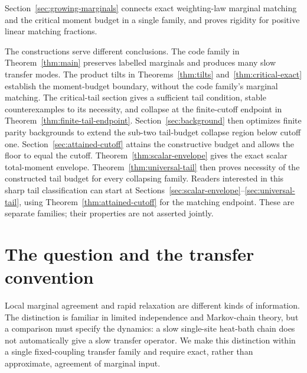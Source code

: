 \documentclass[11pt]{article}
\begin{document}
\begin{abstract}
intermediate bound. We additionally connect exact weighting-law marginals to the critical moment
budget. For every $0<\alpha<1/2$, positive densities with prescribed floor
below one retain exactly uniform marginals through $\lfloor L^\alpha\rfloor$
and norm at most $2^{1/s}$ while their first two eigenvalues tend to one.
Conversely, at any bounded critical norm, matching through every fixed
positive linear fraction forces operator-norm convergence to the unweighted
noise operator and normalized gap $1-\rho$. This implication uses the published
homogeneous moment bound of Kirshner and Samorodnitsky. Critical-power uniform
integrability supplies a separate rigidity criterion at any diverging marginal
order. The intervening sublinear threshold remains unresolved.
External priority is unestablished. Global many-body weights are allowed;
no fixed-range Gibbs, local-dynamics or physical-gap conclusion follows.
\end{abstract}


Section~\ref{sec:growing-marginals} connects exact weighting-law marginal matching and the critical moment budget in a single family, and proves rigidity for positive linear matching fractions.

The constructions serve different conclusions. The code family in
Theorem~\ref{thm:main} preserves labelled marginals and produces many slow
transfer modes. The product tilts in Theorems~\ref{thm:tilts}
and~\ref{thm:critical-exact} establish the moment-budget boundary, without
the code family's marginal matching. The critical-tail section gives a sufficient
tail condition, stable counterexamples to its necessity, and collapse at
the finite-cutoff endpoint in Theorem~\ref{thm:finite-tail-endpoint}.
Section~\ref{sec:background} then optimizes finite parity backgrounds
to extend the sub-two tail-budget collapse region below cutoff one.
Section~\ref{sec:attained-cutoff} attains the constructive budget
and allows the floor to equal the cutoff. Theorem~\ref{thm:scalar-envelope}
gives the exact scalar total-moment envelope. Theorem~\ref{thm:universal-tail}
then proves necessity of the constructed tail budget for every collapsing
family. Readers interested in this sharp tail classification can start at
Sections~\ref{sec:scalar-envelope}--\ref{sec:universal-tail}, using
Theorem~\ref{thm:attained-cutoff} for the matching endpoint.
These are separate families; their properties are not asserted jointly.

\section{The question and the transfer convention}
Local marginal agreement and rapid relaxation are different kinds of
information. The distinction is familiar in limited independence and
Markov-chain theory, but a comparison must specify the dynamics: a slow
single-site heat-bath chain does not automatically give a slow transfer
operator. We make this distinction within a single fixed-coupling transfer
family and require exact, rather than approximate, agreement of marginal
input.
\end{document}
